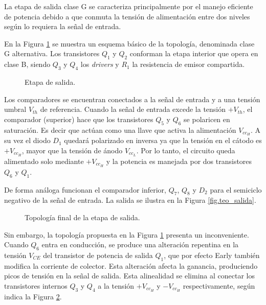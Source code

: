 	La etapa de salida clase G se caracteriza principalmente por el manejo eficiente de potencia debido a que conmuta la tensión de alimentación entre dos niveles según lo requiera la señal de entrada.

	En la Figura \ref{fig.salida} se muestra un esquema básico de la topología, denominada clase G alternativa.  Los transistores $Q_1$ y $Q_2$ conforman la etapa interior que opera en clase B, siendo $Q_3$ y $Q_4$ los \textit{drivers} y $R_1$ la resistencia de emisor compartida. 

	\begin{figure}[H]
		\centering
		\scalebox{0.5}{}
		\caption{Etapa de salida.}
		\label{fig.salida}
	\end{figure}

	Los comparadores se encuentran conectados a la señal de entrada y a una tensión umbral $V_{th}$ de referencia. Cuando la señal de entrada excede la tensión $+V_{th}$, el comparador (superior) hace que los transistores $Q_5$ y $Q_6$ se polaricen en saturación. Es decir que actúan como una llave que activa la alimentación $V_{cc_H}$. A su vez el diodo $D_1$ quedará polarizado en inversa ya que la tensión en el cátodo es $+V_{cc_H}$, mayor que la tensión de ánodo $V_{cc_L}$. Por lo tanto, el circuito queda alimentado solo mediante $+V_{cc_H}$ y la potencia es manejada por dos transistores $Q_6$ y $Q_1$.

	De forma análoga funcionan el comparador inferior, $Q_7$, $Q_8$ y $D_2$ para el semiciclo negativo de la señal de entrada. La salida se ilustra en la Figura \ref{fig.teo_salida}.


	\begin{figure}[H]
		\centering
		\scalebox{0.5}{}
		\caption{Topología final de la etapa de salida.}
		\label{fig.salida_2}
	\end{figure}
	Sin embargo, la topología propuesta en la Figura \ref{fig.salida} presenta un inconveniente. Cuando $Q_6$ entra en conducción, se produce una alteración repentina en la tensión $V_{CE}$ del transistor de potencia de salida $Q_1$, que por efecto Early también modifica la corriente de colector. Esta alteración afecta la ganancia, produciendo picos de tensión en la señal de salida. Esta alinealidad se elimina al conectar los transistores internos $Q_3$ y $Q_4$ a la tensión $+V_{cc_H}$ y $-V_{cc_H}$ respectivamente, según indica la Figura \ref{fig.salida_2}.

